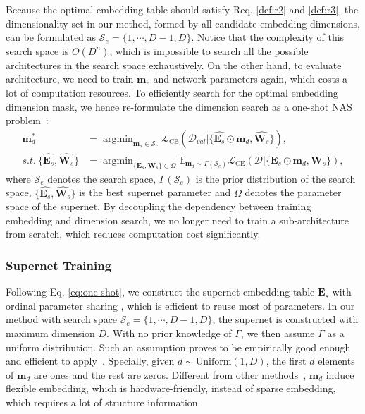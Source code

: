 \documentclass[sigconf]{acmart}
\begin{document}
Because the optimal embedding table should satisfy Req. \ref{def:r2} and \ref{def:r3}, the dimensionality set in our method, formed by all candidate embedding dimensions, can be formulated as $\mathcal{S}_e = \{1, \cdots, D-1, D\}$. Notice that the complexity of this search space is $O(D^n)$, which is impossible to search all the possible architectures in the search space exhaustively. On the other hand, to evaluate architecture, we need to train $\mathbf{m}_e$ and network parameters again, which costs a lot of computation resources. To efficiently search for the optimal embedding dimension mask, we hence re-formulate the dimension search as a one-shot NAS problem~\cite{One-shot,one-shotnas}:
\begin{equation}
\label{eq:one-shot}
\begin{aligned}
    \mathbf{m}_d^* & = \mathop{\arg\min}_{\mathbf{m}_d \in \mathcal{S}_e} \mathcal{L}_{\text{CE}}({\mathcal{D}_{val}|\{\hat{\mathbf{E}_s} \odot \mathbf{m}_d, \hat{\mathbf{W}_s}\}}), \\
    s.t. \ \{\hat{\mathbf{E}_s}, \hat{\mathbf{W}_s}\} & = \mathop{\arg\min}_{\{\mathbf{E}_s, \mathbf{W}_s\} \in \Omega} \mathbb{E}_{\mathbf{m}_d \sim \Gamma(\mathcal{S}_e)} \mathcal{L}_{\text{CE}}(\mathcal{D} | \{\mathbf{E}_s \odot \mathbf{m}_d , \mathbf{W}_s\}),
\end{aligned}
\end{equation}
where $\mathcal{S}_e$ denotes the search space, $\Gamma(\mathcal{S}_e)$ is the prior distribution of the search space, $\{\hat{\mathbf{E}_s}, \hat{\mathbf{W}_s}\}$ is the best supernet parameter and $\Omega$ denotes the parameter space of the supernet. By decoupling the dependency between training embedding and dimension search, we no longer need to train a sub-architecture from scratch, which reduces computation cost significantly. 

\subsubsection{Supernet Training} Following Eq. \ref{eq:one-shot}, we construct the supernet embedding table $\mathbf{E}_s$ with ordinal parameter sharing \cite{AutoIAS}, which is efficient to reuse most of parameters. In our method with search space $\mathcal{S}_e = \{1, \cdots, D-1, D\}$, the supernet is constructed with maximum dimension $D$. With no prior knowledge of $\Gamma$, we then assume $\Gamma$ as a uniform distribution. Such an assumption proves to be empirically good enough and efficient to apply~\cite{One-shot}. Specially, given $d \sim \text{Uniform}(1,D)$, the first $d$ elements of $\mathbf{m}_d$ are ones and the rest are zeros. Different from other methods~\cite{PEP,single-shot}, $\mathbf{m}_d$ induce flexible embedding, which is hardware-friendly, instead of sparse embedding, which requires a lot of structure information.
\end{document}
